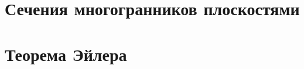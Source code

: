 \documentclass[14pt, oneside]{extbook}
\begin{document}
\section{Сечения многогранников плоскостями}

\section{Теорема Эйлера}



%
%
\end{document}
